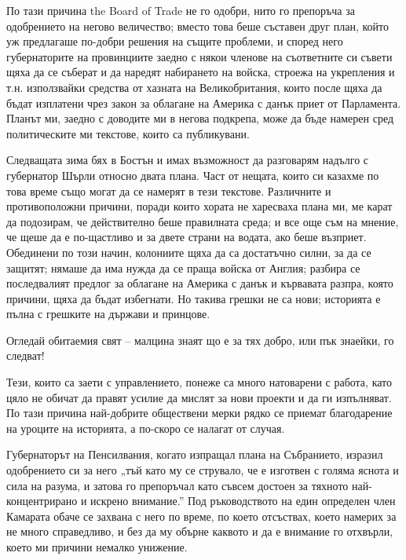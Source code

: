 \documentclass[12pt]{book}
\begin{document}
По тази причина the Board of Trade не го одобри, нито го препоръча за одобрението на негово величество; вместо това беше съставен друг план, който уж предлагаше по-добри решения на същите проблеми, и според него губернаторите на провинциите заедно с някои членове на съответните си съвети щяха да се съберат и да наредят  набирането на войска, строежа на укрепления и т.н. използвайки средства от хазната на Великобритания, които после щяха да бъдат изплатени чрез закон за облагане на Америка с данък приет от Парламента. Планът ми, заедно с доводите ми в негова подкрепа, може да бъде намерен сред политическите ми текстове, които са публикувани.

Следващата зима бях в Бостън и имах възможност да разговарям надълго с губернатор Шърли относно двата плана. Част от нещата, които си казахме по това време също могат да се намерят в тези текстове. Различните и противоположни причини, поради които хората не харесваха плана ми, ме карат да подозирам, че действително беше правилната среда; и все още съм на мнение, че щеше да е по-щастливо и за двете страни на водата, ако беше възприет. Обединени по този начин, колониите щяха да са достатъчно силни, за да се защитят; нямаше да има нужда да се праща войска от Англия; разбира се последвалият предлог за облагане на Америка с данък и кървавата разпра, която причини, щяха да бъдат избегнати. Но такива грешки не са нови; историята е пълна с грешките на държави и принцове.

Огледай обитаемия свят – малцина знаят
що е за тях добро, или пък знаейки, го следват!

Тези, които са заети с управлението, понеже са много натоварени с работа, като цяло не обичат да правят усилие да мислят за нови проекти и да ги изпълняват. По тази причина най-добрите обществени мерки рядко се приемат благодарение на уроците на историята, а по-скоро се налагат от случая. 

Губернаторът на Пенсилвания, когато изпращал плана на Събранието, изразил одобрението си за него „тъй като му се струвало, че е изготвен с голяма яснота и сила на разума, и затова го препоръчал като съвсем достоен за тяхното най-концентрирано и искрено внимание.” Под ръководството на един определен член Камарата обаче се захвана с него по време, по което отсъствах, което намерих за не много справедливо, и без да му обърне каквото и да е внимание го отхвърли, което ми причини немалко унижение.
\end{document}
